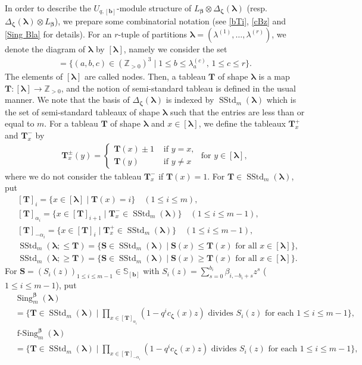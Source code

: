 \documentclass[12pt]{amsart}
\numberwithin{equation}{thm}
\renewcommand\SS{\mathbb S} %
\newcommand\ZZ{\mathbb Z}
\newcommand\bS{\mathbf S}
\newcommand\bT{\mathbf T}
\newcommand\bb{\mathbf b}
\renewcommand\a{\alpha}  %
\renewcommand\b{\beta}   %
\newcommand\la{\lambda}
\newcommand\D{\Delta}
\newcommand\Bb{\boldsymbol\beta}
\newcommand\Bz{\boldsymbol\zeta}
\newcommand\Bla{\boldsymbol\lambda}
\newcommand\ra{\rightarrow}
\newcommand{\SStd}{\operatorname{SStd}}
\newcommand{\Sing}{\operatorname{Sing}}
\newcommand{\fSing}{\operatorname{f-Sing}}
\begin{document}
In order to describe the $U_{q,[\bb]}$-module structure of $L_{\Bb} \otimes \D_{\Bz} (\Bla)$  (resp. $\D_{\Bz} (\Bla) \otimes L_{\Bb}$), 
we prepare some combinatorial notation (see \ref{bTi}, \ref{cBz} and \ref{Sing Bla} for details).  
For an $r$-tuple of partitions $\Bla=(\la^{(1)}, \dots, \la^{(r)})$,  
we denote the diagram of $\Bla$ by $[\Bla]$, 
namely we consider the set 
\begin{align*}
[\Bla]= \{(a,b,c) \in (\ZZ_{>0})^3 \mid 1 \leq b \leq \la_a^{(c)}, \, 1 \leq c \leq r\}.
\end{align*}
The elements of $[\Bla]$ are called nodes. 
Then, a tableau $\bT$ of shape $\Bla$ is a map $\bT : [\Bla] \ra \ZZ_{>0}$, 
and the notion of semi-standard tableau is defined in the usual manner. 
We note that the basis of $\D_{\Bz} (\Bla)$ is indexed by $\SStd_m(\Bla)$ 
which is the set of semi-standard tableaux of shape $\Bla$ such that the entries are less than or equal to $m$. 
For a tableau $\bT$ of shape $\Bla$ and $x \in [\Bla]$, 
we define the tableaux $\bT_x^+$ and $\bT_x^-$ by 
\begin{align*}
\bT_x^{\pm} (y) = \begin{cases} \bT(x) \pm 1 & \text{ if } y=x, \\ \bT(y) & \text{ if } y \not=x \end{cases} 
	\text{ for } y \in [\Bla], 
\end{align*}
where we do not consider the tableau $\bT_x^-$ if $\bT(x) =1$. 
For $\bT \in \SStd_m(\Bla)$, 
put 
\begin{align*}
&[\bT]_i =\{x \in [\Bla] \mid \bT(x) =i\} 
\quad (1 \leq i \leq m), 
\\
&[\bT]_{\a_i} = \{x \in [\bT]_{i+1} \mid \bT_x^- \in \SStd_m (\Bla) \} 
	\quad (1 \leq i \leq m-1), 
\\
& [\bT]_{-\a_i} = \{ x \in [\bT]_i \mid \bT_x^+ \in \SStd_m(\Bla) \} 
	\quad (1 \leq i \leq m-1), 
\\
& \SStd_m (\Bla ; \leq \bT) = \{\bS \in \SStd_m(\Bla) \mid \bS(x) \leq \bT(x) \text{ for all } x \in [\Bla]\}, 
\\
& \SStd_m (\Bla ; \geq \bT) = \{\bS \in \SStd_m(\Bla) \mid \bS(x) \geq \bT(x) \text{ for all } x \in [\Bla]\}. 
\end{align*}
For $\bS=(S_i(z))_{1 \leq i \leq m-1} \in \SS_{[\bb]}$ with $S_i(z) = \sum_{s=0}^{b_i} \b_{i, - b_i +s} z^s$ ($1 \leq i \leq m-1$), 
put 
\begin{align*}
&\Sing_m^{\Bb} (\Bla) 
\\
&= \{ \bT\in \SStd_m(\Bla) \mid 
	\prod_{x \in [\bT]_{\a_i}}  (1 - q^i c_{\Bz} (x) z)  \text{ divides } S_i(z)  \text{ for each }  1 \leq i \leq m-1  \}, 
\\
&\fSing_m^{\Bb} (\Bla) 
\\
&= \{ \bT\in \SStd_m(\Bla) \mid 
	\prod_{x \in [\bT]_{-\a_i}} (1 - q^i c_{\Bz} (x) z)  \text{ divides } S_i(z)  \text{ for each }  1 \leq i \leq m-1 \}, 
\end{align*}
\end{document}
